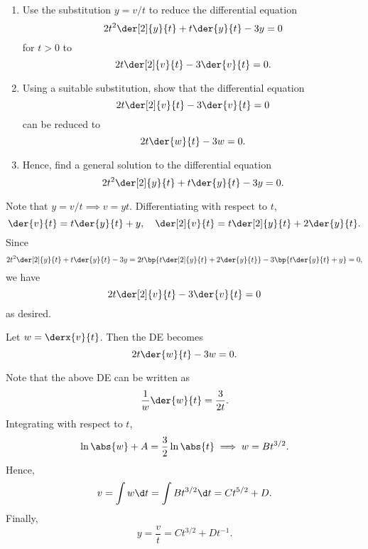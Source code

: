 \clearpage
\begin{problem}
    \begin{enumerate}
        \item Use the substitution $y = v/t$ to reduce the differential equation \[2t^2 \der[2]{y}{t} + t\der{y}{t} - 3y = 0\] for $t > 0$ to \[2t\der[2]{v}{t} - 3\der{v}{t} = 0.\]
        \item Using a suitable substitution, show that the differential equation \[2t\der[2]{v}{t} - 3\der{v}{t} = 0\] can be reduced to \[2t \der{w}{t} - 3w = 0.\]
        \item Hence, find a general solution to the differential equation \[2t^2 \der[2]{y}{t} + t\der{y}{t} - 3y = 0.\]
    \end{enumerate}
\end{problem}
\begin{solution}
    \begin{ppart}
        Note that $y = v/t \implies v = yt$. Differentiating with respect to $t$, \[\der{v}{t} = t \der{y}{t} + y, \quad \der[2]{v}{t} = t\der[2]{y}{t} + 2 \der{y}{t}.\] Since \[2t^2 \der[2]{y}{t} + t\der{y}{t} - 3y = 2t \bp{t\der[2]{y}{t} + 2 \der{y}{t}} - 3\bp{t \der{y}{t} + y} = 0,\] we have \[2t\der[2]{v}{t} - 3\der{v}{t} = 0\] as desired.
    \end{ppart}
    \begin{ppart}
        Let $w = \derx{v}{t}$. Then the DE becomes \[2t \der{w}{t} - 3w = 0.\]
    \end{ppart}
    \begin{ppart}
        Note that the above DE can be written as \[\frac1w \der{w}{t} = \frac3{2t}.\] Integrating with respect to $t$, \[\ln \abs{w} + A = \frac32 \ln \abs{t} \implies w = B t^{3/2}.\] Hence, \[v = \int w \d t = \int B t^{3/2} \d t = C t^{5/2} + D.\] Finally, \[y = \frac{v}{t} = C t^{3/2} + D t^{-1}.\]
    \end{ppart}
\end{solution}